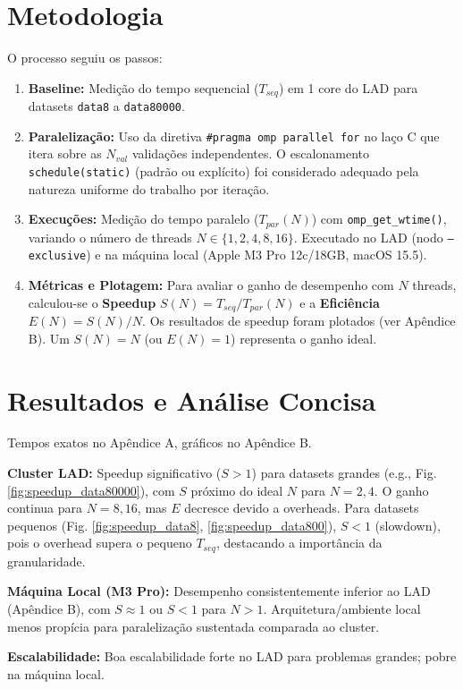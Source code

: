 \documentclass[10pt,a4paper]{article}
\begin{document}
\section*{Metodologia}
O processo seguiu os passos:
\begin{enumerate} \itemsep0pt \parskip0pt
    \item \textbf{Baseline:} Medição do tempo sequencial ($T_{seq}$) em 1 core do LAD para datasets \texttt{data8} a \texttt{data80000}.
    \item \textbf{Paralelização:} Uso da diretiva \texttt{\#pragma omp parallel for} no laço C que itera sobre as $N_{val}$ validações independentes. O escalonamento \texttt{schedule(static)} (padrão ou explícito) foi considerado adequado pela natureza uniforme do trabalho por iteração.
    \item \textbf{Execuções:} Medição do tempo paralelo ($T_{par}(N)$) com \texttt{omp\_get\_wtime()}, variando o número de threads $N \in \{1, 2, 4, 8, 16\}$. Executado no LAD (nodo \texttt{--exclusive}) e na máquina local (Apple M3 Pro 12c/18GB, macOS 15.5).
    \item \textbf{Métricas e Plotagem:} Para avaliar o ganho de desempenho com $N$ threads, calculou-se o \textbf{Speedup} $S(N) = T_{seq} / T_{par}(N)$ e a \textbf{Eficiência} $E(N) = S(N) / N$. Os resultados de speedup foram plotados (ver Apêndice B). Um $S(N)=N$ (ou $E(N)=1$) representa o ganho ideal.
\end{enumerate}

\section*{Resultados e Análise Concisa}
Tempos exatos no Apêndice A, gráficos no Apêndice B.

\textbf{Cluster LAD:} Speedup significativo ($S>1$) para datasets grandes (e.g., Fig. \ref{fig:speedup_data80000}), com $S$ próximo do ideal $N$ para $N=2, 4$. O ganho continua para $N=8, 16$, mas $E$ decresce devido a overheads. Para datasets pequenos (Fig. \ref{fig:speedup_data8}, \ref{fig:speedup_data800}), $S < 1$ (slowdown), pois o overhead supera o pequeno $T_{seq}$, destacando a importância da granularidade.

\textbf{Máquina Local (M3 Pro):} Desempenho consistentemente inferior ao LAD (Apêndice B), com $S \approx 1$ ou $S < 1$ para $N>1$. Arquitetura/ambiente local menos propícia para paralelização sustentada comparada ao cluster.

\textbf{Escalabilidade:} Boa escalabilidade forte no LAD para problemas grandes; pobre na máquina local.
\end{document}
